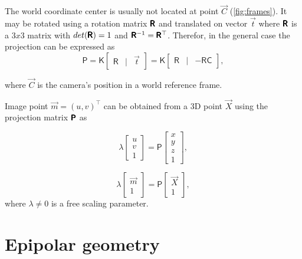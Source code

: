 The world coordinate center is usually not located at point $\vec{C}$ (\autoref{fig:frames}). 
It may be rotated using a rotation matrix $\pmb{\mathsf{R}}$ and translated on vector $\vec{t}$ where $\pmb{\mathsf{R}}$ is a $3x3$ matrix with $det(\pmb{\mathsf{R}}) = 1$ and $\pmb{\mathsf{R}}^{-1} = \pmb{\mathsf{R}}^\top$. 
Therefor, in the general case the projection can be expressed as
\begin{equation}
    \label{eq:PKRt}
    \pmb{\mathsf{P}} = \pmb{\mathsf{K}} \begin{bmatrix} \pmb{\mathsf{R}} & | & \vec{t} \end{bmatrix} = 
    \pmb{\mathsf{K}} \begin{bmatrix} \pmb{\mathsf{R}} & | & - \pmb{\mathsf{R}} \pmb{\mathsf{C}} \end{bmatrix},
\end{equation}

where $\vec{C}$ is the camera's position in a world reference frame. 

Image point $\vec{m} = (u, v)^\top$ can be obtained from a 3D point $\vec{X}$ using the projection matrix $\pmb{\mathsf{P}}$ as

\begin{equation}
    \label{eq:projection}
    \lambda \begin{bmatrix} 
        u \\ v \\ 1 \end{bmatrix} = \pmb{\mathsf{P}} \begin{bmatrix} x \\ y \\ z \\ 1
    \end{bmatrix},
\end{equation}

\begin{equation}
    \lambda \begin{bmatrix} 
    \vec{m} \\ 1 \end{bmatrix} = \pmb{\mathsf{P}} \begin{bmatrix} \vec{X} \\ 1
\end{bmatrix},
\end{equation}
where $\lambda \neq 0$ is a free scaling parameter.

\section{Epipolar geometry}

